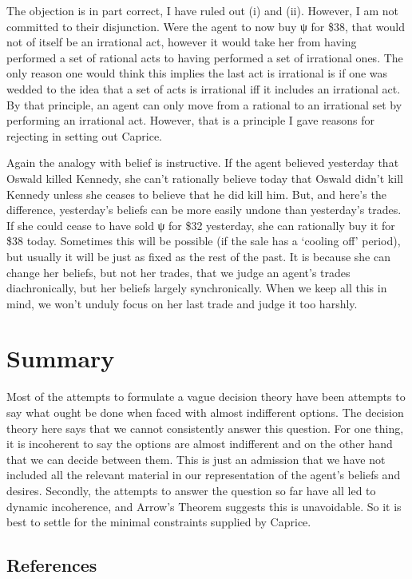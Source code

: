 \documentclass[
  11pt,
  letterpaper,
  DIV=11,
  numbers=noendperiod,
  twoside]{scrartcl}
\begin{document}
The objection is in part correct, I have ruled out (i) and (ii).
However, I am not committed to their disjunction. Were the agent to now
buy ψ for \$38, that would not of itself be an irrational act, however
it would take her from having performed a set of rational acts to having
performed a set of irrational ones. The only reason one would think this
implies the last act is irrational is if one was wedded to the idea that
a set of acts is irrational iff it includes an irrational act. By that
principle, an agent can only move from a rational to an irrational set
by performing an irrational act. However, that is a principle I gave
reasons for rejecting in setting out Caprice.

Again the analogy with belief is instructive. If the agent believed
yesterday that Oswald killed Kennedy, she can't rationally believe today
that Oswald didn't kill Kennedy unless she ceases to believe that he did
kill him. But, and here's the difference, yesterday's beliefs can be
more easily undone than yesterday's trades. If she could cease to have
sold ψ for \$32 yesterday, she can rationally buy it for \$38 today.
Sometimes this will be possible (if the sale has a `cooling off'
period), but usually it will be just as fixed as the rest of the past.
It is because she can change her beliefs, but not her trades, that we
judge an agent's trades diachronically, but her beliefs largely
synchronically. When we keep all this in mind, we won't unduly focus on
her last trade and judge it too harshly.

\section{Summary}\label{summary}

Most of the attempts to formulate a vague decision theory have been
attempts to say what ought be done when faced with almost indifferent
options. The decision theory here says that we cannot consistently
answer this question. For one thing, it is incoherent to say the options
are almost indifferent and on the other hand that we can decide between
them. This is just an admission that we have not included all the
relevant material in our representation of the agent's beliefs and
desires. Secondly, the attempts to answer the question so far have all
led to dynamic incoherence, and Arrow's Theorem suggests this is
unavoidable. So it is best to settle for the minimal constraints
supplied by Caprice.

\subsection*{References}\label{references}
\end{document}
